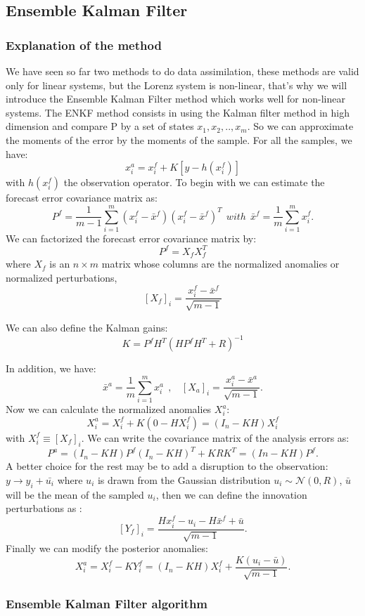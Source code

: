 \subsection{Ensemble Kalman Filter}
\subsubsection{Explanation of the method}
\noindent We have seen so far two methods to do data assimilation, these methods are valid only for linear systems, but the Lorenz system is non-linear, that's why we will introduce the Ensemble Kalman Filter method which works well for non-linear systems. The ENKF method consists in using the Kalman filter method in high dimension and compare P by a set of states $x_1,x_2,..,x_{m}$. So we can approximate the moments of the error by the moments of the sample.
For all the samples, we have:
$$x_i^a=x_i^f+K[y-h(x_i^f)]$$
with $h(x_i^f)$ the observation operator.
\newline \noindent To begin with we can estimate the
forecast error covariance matrix as:
$$P^f=\frac{1}{m-1}\sum_{i=1}^{m}(x_i^f-\bar{x}^f)(x_i^f-\bar{x}^f)^T~~with~~\bar{x}^f=\frac{1}{m}\sum_{i=1}^{m}x_i^f .$$ 
\noindent We can factorized the forecast error covariance matrix by:
$$P^f=X_f X_f^T$$
where $X_f$ is an $n \times m$ matrix whose columns are the normalized anomalies or normalized perturbations,
$$[X_f]_i=\frac{x_i^f-\bar{x}^f}{\sqrt{m-1}}$$

\noindent We can also define the Kalman gains: 
$$K=P^f H^T(HP^f H^T+R)^{-1}$$

\noindent In addition, we have:
$$
\bar{x}^a=\frac{1}{m}\sum_{i=1}^mx_i^a~~,~~~~[X_a]_i=\frac{x_i^a-\bar{x}^a}{\sqrt{m-1}}. $$
\noindent Now we can calculate the normalized anomalies $X_i^a:$
$$X_i^a=X_i^f+K(0-HX_i^f)=(I_n-KH)X_i^f$$
\noindent with $X_i^f\equiv [X_f]_i$.
\newline \noindent We can write the covariance matrix of the analysis errors as:
$$P^a=(I_n-KH)P^f(I_n-KH)^T+KRK^T=(In-KH)P^f.$$
\noindent A better choice for the rest may be to add a disruption to the observation: $y\rightarrow y_i+\bar{u_i}$ where $u_i$ is drawn from the Gaussian distribution $u_i \sim \mathcal{N}(0,R)$, $\bar{u}$ will be the mean of the sampled $u_i$, then we can define the innovation perturbations as :
$$[Y_f]_i=\frac{Hx_i^f-u_i-H\bar{x}^f+\bar{u}}{\sqrt{m-1}}.$$
\noindent Finally we can modify the posterior anomalies:
$$X_i^a=X_i^f-KY_i^f=(I_n-KH)X_i^f+\frac{K(u_i-\bar{u})}{\sqrt{m-1}}.$$
\newpage
\subsubsection{Ensemble Kalman Filter algorithm }




